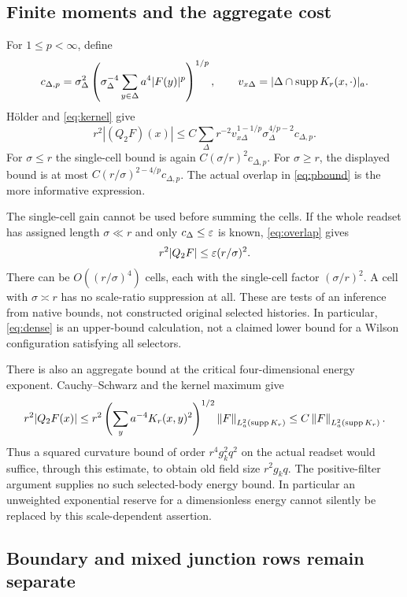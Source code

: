 \documentclass[11pt,letterpaper]{article}
\theoremstyle{plain}
\theoremstyle{remark}\newtheorem{remark}[theorem]{Scope}
\newcommand{\norm}[1]{\left\lVert#1\right\rVert}
\begin{document}
\subsection{Finite moments and the aggregate cost}

For $1\le p<\infty$, define
\[
 c_{\Delta,p}=\sigma_\Delta^2
 \left(\sigma_\Delta^{-4}\sum_{y\in\Delta}a^4|F(y)|^p\right)^{1/p},
 \qquad v_{x\Delta}=|\Delta\cap\operatorname{supp} K_r(x,\cdot)|_a.
\]
H\"older and \eqref{eq:kernel} give
\begin{equation}
 r^2|(Q_2F)(x)|
 \le C\sum_\Delta r^{-2}v_{x\Delta}^{1-1/p}
       \sigma_\Delta^{4/p-2}c_{\Delta,p}.
 \label{eq:pbound}
\end{equation}
For $\sigma\le r$ the single-cell bound is again
$C(\sigma/r)^2c_{\Delta,p}$. For $\sigma\ge r$, the displayed bound is
at most $C(r/\sigma)^{2-4/p}c_{\Delta,p}$. The actual overlap in
\eqref{eq:pbound} is the more informative expression.

The single-cell gain cannot be used before summing the cells. If the whole
readset has assigned length $\sigma\ll r$ and only
$c_\Delta\le\varepsilon$ is known, \eqref{eq:overlap} gives
\begin{equation}
 r^2|Q_2F|\le\varepsilon(r/\sigma)^2.
 \label{eq:dense}
\end{equation}
There can be $O((r/\sigma)^4)$ cells, each with the single-cell factor
$(\sigma/r)^2$. A cell with $\sigma\asymp r$ has no scale-ratio
suppression at all. These are tests of an inference from native bounds,
not constructed original selected histories. In particular,
\eqref{eq:dense} is an upper-bound calculation, not a claimed lower bound
for a Wilson configuration satisfying all selectors.

There is also an aggregate bound at the critical four-dimensional energy
exponent. Cauchy--Schwarz and the kernel maximum give
\begin{equation}
 r^2|Q_2F(x)|
 \le r^2\left(\sum_y a^{-4}K_r(x,y)^2\right)^{1/2}
            \norm{F}_{L_a^2(\supp K_r)}
 \le C\norm{F}_{L_a^2(\supp K_r)}.
 \label{eq:L2aggregate}
\end{equation}
Thus a squared curvature bound of order $r^4g_k^2q^2$ on the actual readset
would suffice, through this estimate, to obtain old field size $r^2g_kq$.
The positive-filter argument supplies no such selected-body energy bound.
In particular an unweighted exponential reserve for a dimensionless energy
cannot silently be replaced by this scale-dependent assertion.

\subsection{Boundary and mixed junction rows remain separate}
\end{document}
